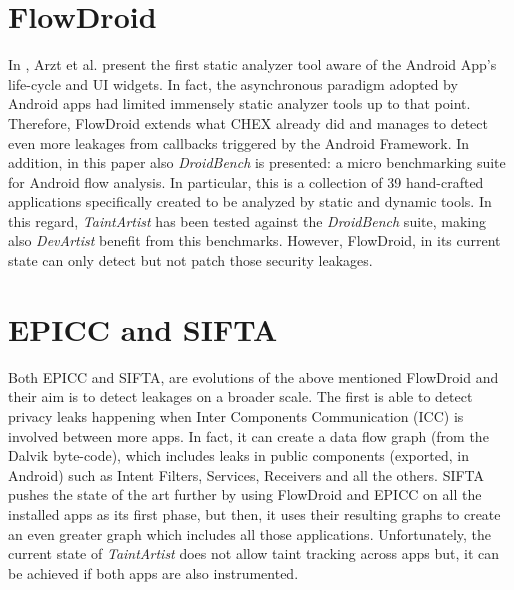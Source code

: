 \section{FlowDroid}
In \cite{flowdroid}, Arzt et al. present the first static analyzer tool aware of the Android App's life-cycle and UI widgets. In fact, the asynchronous paradigm adopted by Android apps had limited immensely static analyzer tools up to that point. Therefore, FlowDroid extends what CHEX already did and manages to detect even more leakages from callbacks triggered by the Android Framework. In addition, in this paper also \emph{DroidBench} is presented: a micro benchmarking suite for Android flow analysis. In particular, this is a collection of 39 hand-crafted applications specifically created to be analyzed by static and dynamic tools. In this regard, \emph{TaintArtist} has been tested against the \emph{DroidBench} suite, making also \emph{DevArtist} benefit from this benchmarks. However, FlowDroid, in its current state can only detect but not patch those security leakages.

\section{EPICC and SIFTA}
Both EPICC\cite{epicc} and SIFTA\cite{sifta}, are evolutions of the above mentioned FlowDroid and their aim is to detect leakages on a broader scale. The first is able to detect privacy leaks happening when Inter Components Communication (ICC) is involved between more apps. In fact, it can create a data flow graph (from the Dalvik byte-code), which includes leaks in public components (exported, in Android) such as Intent Filters, Services, Receivers and all the others. SIFTA pushes the state of the art further by using FlowDroid and EPICC on all the installed apps as its first phase, but then, it uses their resulting graphs to create an even greater graph which includes all those applications. Unfortunately, the current state of \emph{TaintArtist} does not allow taint tracking across apps but, it can be achieved if both apps are also instrumented.

